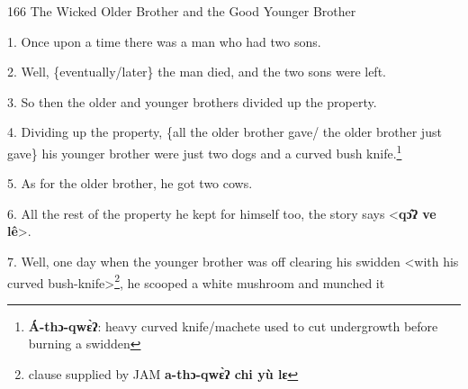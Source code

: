 
166 The Wicked Older Brother and the Good Younger Brother

1. Once upon a time there was a man who had two sons.

2. Well, \{eventually/later\} the man died, and the two sons were left.

3. So then the older and younger brothers divided up the property.

4. Dividing up the property, \{all the older brother gave/ the older brother just
gave\} his younger brother were just two dogs and a curved bush knife.\footnote{\textbf{Á-thɔ-qwɛ̀ʔ}: heavy curved knife/machete used to cut undergrowth before burning a swidden}

5. As for the older brother, he got two cows.

6. All the rest of the property he kept for himself too, the story says <\textbf{qɔ̂ʔ
ve lê}>.

7. Well, one day when the younger brother was off clearing his swidden <with
his curved bush-knife>\footnote{clause supplied by JAM \textbf{a-thɔ-qwɛ̀ʔ chi yù lɛ }}, he scooped a white mushroom and munched it
